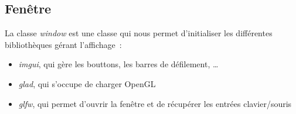\subsection{Fenêtre}
La classe \textit{window} est une classe qui nous permet d'initialiser les différentes bibliothèques gérant l'affichage :
\begin{itemize}
    \item \textit{imgui}, qui gère les bouttons, les barres de défilement, …
    \item \textit{glad}, qui s'occupe de charger OpenGL
    \item \textit{glfw}, qui permet d'ouvrir la fenêtre et de récupérer les entrées clavier/souris
\end{itemize}


